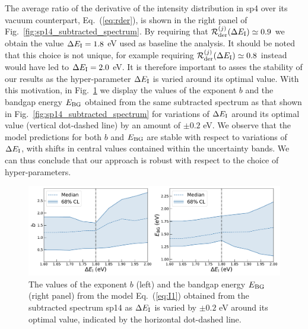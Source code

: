 The average ratio of the derivative of the intensity
distribution in sp4 over its vacuum counterpart, Eq.~(\ref{eq:rder}), is shown
in the right panel of  Fig.~\ref{fig:sp14_subtracted_spectrum}. 
%
By requiring that $\mathcal{R}^{(j)}_{\rm der}(\Delta E_{\rm I})\simeq 0.9$ we obtain
the value $\Delta E_{\rm I}=1.8$ eV used as baseline the analysis.
%
It should be noted that this choice is not unique, for example requiring
$\mathcal{R}^{(j)}_{\rm der}(\Delta E_{\rm I})\simeq 0.8$ instead would have led
to $\Delta E_{\rm I}=2.0$ eV.
%
It is therefore important to asses the stability of our results as the hyper-parameter $\Delta E_{\rm I}$
is varied around its optimal value.
%
With this motivation, in Fig.~\ref{fig:bvalues_sampleA} we display the
values of the exponent $b$
and the bandgap energy $E_{\rm BG}$ 
obtained from the same subtracted spectrum as that shown in
Fig.~\ref{fig:sp14_subtracted_spectrum} for variations of $\Delta E_{\rm I}$ 
around its optimal value (vertical dot-dashed line) by an amount
of $\pm 0.2$ eV.
%
We observe that the model predictions for both $b$ and $E_{\rm BG}$ are stable with respect
to variations of $\Delta E_{\rm I}$, with shifts in central values contained within the
uncertainty bands.
%
We can thus conclude that our approach is robust with respect to the choice of
hyper-parameters.

\begin{figure}[t]
\begin{centering}
  \includegraphics[width=0.99\linewidth]{plots/Stability_plots_sp14.pdf} 
  \caption{\small The values of the exponent $b$ (left)
    and the bandgap energy $E_{\rm BG}$ (right panel) from the model Eq.~(\ref{eq:I1})
    obtained from the subtracted spectrum sp14 as $\Delta E_{\rm I}$ is varied by $\pm 0.2$ eV
    around its optimal value, indicated by the horizontal dot-dashed line.
  }
\label{fig:bvalues_sampleA}
\end{centering}
\end{figure}

